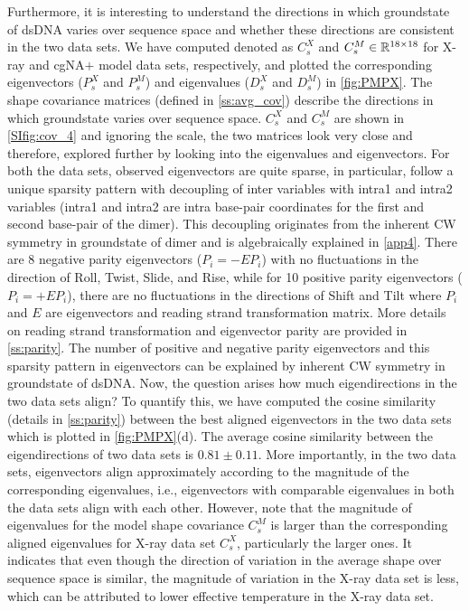 Furthermore, it is interesting to understand the directions in which groundstate of dsDNA varies over sequence space and whether these directions are consistent in the two data sets. 
We have computed  denoted as $C_s^X$ and $C_s^M \in {\mathbb R}^{18 \times 18}$ for X-ray and cgNA$+$ model data sets, respectively, and plotted the corresponding eigenvectors ($P_s^X$ and $P_s^M$) and eigenvalues ($D_s^X$ and $D_s^M$) in \cref{fig:PMPX}.
The shape covariance matrices (defined in \cref{ss:avg_cov}) describe the directions in which groundstate varies over sequence space. 
$C_s^X$ and $C_s^M$ are shown in \cref{SIfig:cov_4} and ignoring the scale, the two matrices look very close and therefore, explored further by looking into the eigenvalues and eigenvectors.
For both the data sets, observed eigenvectors are quite sparse, in particular, follow a unique sparsity pattern with decoupling of inter variables with intra1 and intra2 variables (intra1 and intra2 are intra base-pair coordinates for the first and second base-pair of the dimer).
This decoupling originates from the inherent CW symmetry in groundstate of dimer and is algebraically explained in \cref{app4}.
There are 8 negative parity eigenvectors ($P_i=-EP_i$) with no fluctuations in the direction of Roll, Twist, Slide, and Rise, while for 10 positive parity eigenvectors ($P_i=+EP_i$), there are no fluctuations in the directions of Shift and Tilt where $P_i$ and $E$ are eigenvectors and reading strand transformation matrix. 
More details on reading strand transformation and eigenvector parity are provided in \cref{ss:parity}.
The number of positive and negative parity eigenvectors and this sparsity pattern in eigenvectors can be explained by inherent CW symmetry in groundstate of dsDNA. 
Now, the question arises how much eigendirections in the two data sets align? 
To quantify this, we have computed the cosine similarity (details in \cref{ss:parity}) between the best aligned eigenvectors in the two data sets which is plotted in \cref{fig:PMPX}(d). 
The average cosine similarity between the eigendirections of two data sets is $0.81 \pm 0.11$.
More importantly, in the two data sets, eigenvectors align approximately according to the magnitude of the corresponding eigenvalues, i.e., eigenvectors with comparable eigenvalues in both the data sets align with each other.
However, note that the magnitude of eigenvalues for the model shape covariance $C_s^M$ is larger than the corresponding aligned eigenvalues for X-ray data set $C_s^X$, particularly the larger ones.
It indicates that even though the direction of variation in the average shape over sequence space is similar, the magnitude of variation in the X-ray data set is less, which can be attributed to lower effective temperature in the X-ray data set.

